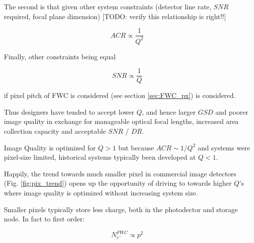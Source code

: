 \documentclass[10pt,journal]{IEEEtran}  %
\begin{document}
The second is that given other system constraints (detector line rate, $SNR$ required, focal plane dimension) [TODO: verify this relationship is right!!]

\begin{equation}
    ACR \propto \frac{1}{Q^2}
\end{equation}

Finally, other constraints being equal

\begin{equation}
    SNR \propto \frac{1}{Q}
\end{equation}

if pixel pitch of FWC is considered (see section \ref{sec:FWC_px}) is considered.

Thus designers have tended to accept lower $Q$, and hence larger $GSD$ and poorer image quality in exchange for manageable optical focal lengths, increased area collection capacity and acceptable $SNR$ / $DR$.

\begin{observation}[$Q > 1$]
Image Quality is optimized for $Q>1$ but because $ACR \sim 1/Q^2$ and systems were pixel-size limited, historical systems typically been developed at $Q<1$.
\end{observation}

Happily, the trend towards much smaller pixel in commercial image detectors (Fig. \ref{fig:pix_trend}) opens up the opportunity of driving to towards higher $Q$'s where image quality is optimized without increasing system size.

Smaller pixels typically store less charge, both in the photodector and storage node. In fact to first order\cite{jerram}:

\begin{equation}
  \label{eq:pix_fwc_scaling}  
N_{e^-}^{FWC} \propto p^2
\end{equation}
\end{document}
